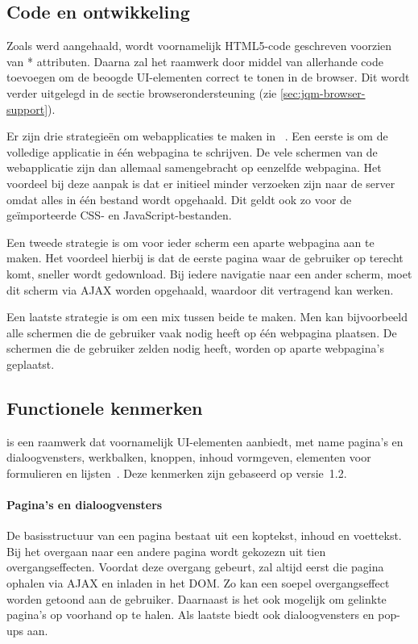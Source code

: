 \subsection{Code en ontwikkeling}
Zoals werd aangehaald, wordt voornamelijk HTML5-code geschreven voorzien van * attributen. 
Daarna zal het raamwerk door middel van  allerhande code toevoegen om de beoogde UI-elementen correct te tonen in de browser. 
Dit wordt verder uitgelegd in de sectie browserondersteuning (zie \ref{sec:jqm-browser-support}).

Er zijn drie strategieën om webapplicaties te maken in \jqm{}~\cite{Broulik2012}. 
Een eerste is om de volledige applicatie in één webpagina te schrijven. 
De vele schermen van de webapplicatie zijn dan allemaal samengebracht op eenzelfde webpagina. 
Het voordeel bij deze aanpak is dat er initieel minder verzoeken zijn naar de server omdat alles in één bestand wordt opgehaald. 
Dit geldt ook zo voor de geïmporteerde CSS- en JavaScript-bestanden. 

Een tweede strategie is om voor ieder scherm een aparte webpagina aan te maken. 
Het voordeel hierbij is dat de eerste pagina waar de gebruiker op terecht komt, sneller wordt gedownload. 
Bij iedere navigatie naar een ander scherm, moet dit scherm via AJAX worden opgehaald, waardoor dit vertragend kan werken. 

Een laatste strategie is om een mix tussen beide te maken. 
Men kan bijvoorbeeld alle schermen die de gebruiker vaak nodig heeft op één webpagina plaatsen. 
De schermen die de gebruiker zelden nodig heeft, worden op aparte webpagina's geplaatst.   

\subsection{Functionele kenmerken}
\jqm{} is een raamwerk dat voornamelijk UI-elementen aanbiedt, met name pagina's en dialoogvensters, werkbalken, knoppen, inhoud vormgeven, elementen voor formulieren en lijsten~\cite{JQuery2012b}.
Deze kenmerken zijn gebaseerd op versie~1.2.

\paragraph{Pagina's en dialoogvensters}
De basisstructuur van een pagina bestaat uit een koptekst, inhoud en voettekst. 
Bij het overgaan naar een andere pagina wordt gekozezn uit tien overgangseffecten. 
Voordat deze overgang gebeurt, zal \jqm{} altijd eerst die pagina ophalen via AJAX en inladen in het DOM. 
Zo kan een soepel overgangseffect worden getoond aan de gebruiker. 
Daarnaast is het ook mogelijk om gelinkte pagina's op voorhand op te halen. 
Als laatste biedt \jqm{} ook dialoogvensters en pop-ups aan. 

